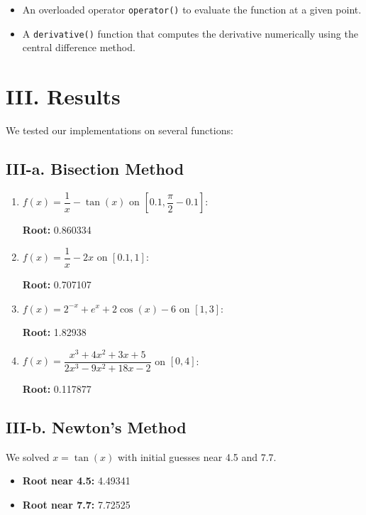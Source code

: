 \documentclass[a4paper]{article}
\begin{document}
\begin{itemize}
    \item An overloaded operator \texttt{operator()} to evaluate the function at a given point.
    \item A \texttt{derivative()} function that computes the derivative numerically using the central difference method.
\end{itemize}

\section*{III. Results}

We tested our implementations on several functions:

\subsection*{III-a. Bisection Method}

\begin{enumerate}
    \item $f(x) = \dfrac{1}{x} - \tan(x)$ on $[0.1, \dfrac{\pi}{2} - 0.1]$:

    \textbf{Root:} 0.860334

    \item $f(x) = \dfrac{1}{x} - 2x$ on $[0.1, 1]$:

    \textbf{Root:} 0.707107

    \item $f(x) = 2^{-x} + e^{x} + 2\cos(x) - 6$ on $[1, 3]$:

    \textbf{Root:} 1.82938

    \item $f(x) = \dfrac{x^3 + 4x^2 + 3x + 5}{2x^3 - 9x^2 + 18x - 2}$ on $[0, 4]$:

    \textbf{Root:} 0.117877
\end{enumerate}

\subsection*{III-b. Newton's Method}

We solved $x = \tan(x)$ with initial guesses near 4.5 and 7.7.

\begin{itemize}
    \item \textbf{Root near 4.5:} 4.49341
    \item \textbf{Root near 7.7:} 7.72525
\end{itemize}
\end{document}
